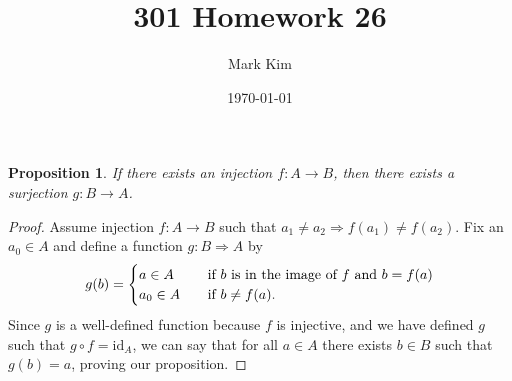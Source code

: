 \documentclass[12pt]{amsart}
\title{301 Homework 26}
\author{Mark Kim}
\date{\today}
\newtheorem*{proposition}{Proposition}
\begin{document}
\maketitle

\begin{proposition}
If there exists an injection $f\colon A\rightarrow B$, then there exists a surjection $g\colon B\rightarrow A$.
\end{proposition}

\begin{proof}
Assume injection $f\colon A\rightarrow B$ such that $a_1 \neq a_2 \Rightarrow f(a_1) \neq f(a_2)$.  Fix an $a_0\in A$ and define a function $g\colon B \Rightarrow A$ by
\begin{align*}
g(b) =
\begin{cases}
a\in A\hspace{0.5cm}&\text{if $b$ is in the image of $f$ and $b = f(a)$}\\
a_0\in A&\text{if $b\neq f(a)$.}
\end{cases}
\end{align*}
Since $g$ is a well-defined function because $f$ is injective, and we have defined $g$ such that $g\circ f= \text{id}_A$, we can say that for all $a\in A$ there exists $b\in B$ such that $g(b)=a$, proving our proposition.
\end{proof}
\end{document}
